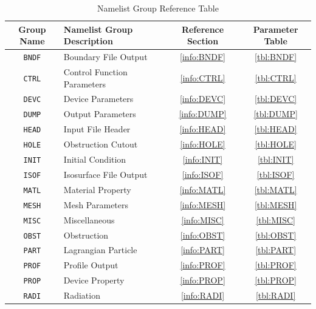 \documentclass[11pt]{book}
\newcommand{\ct}{\tt\small}
\begin{document}
\vspace{\baselineskip}
\begin{table}[ht]
\begin{center}
\caption{Namelist Group Reference Table}
\label{tbl:namelistgroups}
\begin{tabular}{|c|l|c|c|}
\hline
Group Name  & Namelist Group Description& Reference Section & Parameter Table  \\ \hline
{\ct BNDF}  & Boundary File Output         & \ref{info:BNDF} & \ref{tbl:BNDF}  \\ \hline
{\ct CTRL}  & Control Function Parameters  & \ref{info:CTRL} & \ref{tbl:CTRL}  \\ \hline
{\ct DEVC}  & Device Parameters            & \ref{info:DEVC} & \ref{tbl:DEVC}  \\ \hline
{\ct DUMP}  & Output Parameters            & \ref{info:DUMP} & \ref{tbl:DUMP}  \\ \hline
{\ct HEAD}  & Input File Header            & \ref{info:HEAD} & \ref{tbl:HEAD}  \\ \hline
{\ct HOLE}  & Obstruction Cutout           & \ref{info:HOLE} & \ref{tbl:HOLE}  \\ \hline
{\ct INIT}  & Initial Condition            & \ref{info:INIT} & \ref{tbl:INIT}  \\ \hline
{\ct ISOF}  & Isosurface File Output       & \ref{info:ISOF} & \ref{tbl:ISOF}  \\ \hline
{\ct MATL}  & Material Property            & \ref{info:MATL} & \ref{tbl:MATL}  \\ \hline
{\ct MESH}  & Mesh Parameters              & \ref{info:MESH} & \ref{tbl:MESH}  \\ \hline
{\ct MISC}  & Miscellaneous                & \ref{info:MISC} & \ref{tbl:MISC}  \\ \hline
{\ct OBST}  & Obstruction                  & \ref{info:OBST} & \ref{tbl:OBST}  \\ \hline
{\ct PART}  & Lagrangian Particle          & \ref{info:PART} & \ref{tbl:PART}  \\ \hline
{\ct PROF}  & Profile Output               & \ref{info:PROF} & \ref{tbl:PROF}  \\ \hline
{\ct PROP}  & Device Property              & \ref{info:PROP} & \ref{tbl:PROP}  \\ \hline
{\ct RADI}  & Radiation                    & \ref{info:RADI} & \ref{tbl:RADI}  \\ \hline

\end{tabular}
\end{center}
\end{table}
\end{document}
